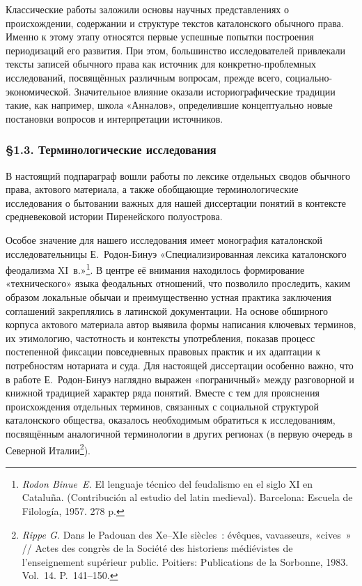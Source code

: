 Классические работы заложили основы научных представлениях о происхождении, содержании и структуре текстов каталонского обычного права. Именно к этому этапу относятся первые успешные попытки построения периодизаций его развития. При этом, большинство исследователей привлекали тексты записей обычного права как источник для конкретно-проблемных исследований, посвящённых различным вопросам, прежде всего, социально-экономической. Значительное влияние оказали историографические традиции такие, как например, школа «Анналов», определившие концептуально новые постановки вопросов и интерпретации источников.

\subsubsection*{§1.3. Терминологические исследования}

В настоящий подпараграф вошли работы по лексике отдельных сводов обычного права, актового материала, а также обобщающие терминологические исследования о бытовании важных для нашей диссертации понятий в контексте средневековой истории Пиренейского полуострова.

Особое значение для нашего исследования имеет монография каталонской исследовательницы Е.~Родон-Бинуэ «Специализированная лексика каталонского феодализма XI~в.»\footnote{\emph{Rodon Binue~E.} El lenguaje técnico del feudalismo en el siglo XI en Cataluña. (Contribución al estudio del latin medieval). Barcelona: Escuela de Filología, 1957. 278 p.}. В центре её внимания находилось формирование «технического» языка феодальных отношений, что позволило проследить, каким образом локальные обычаи и преимущественно устная практика заключения соглашений закреплялись в латинской документации. На основе обширного корпуса актового материала автор выявила формы написания ключевых терминов, их этимологию, частотность и контексты употребления, показав процесс постепенной фиксации повседневных правовых практик и их адаптации к потребностям нотариата и суда. Для настоящей диссертации особенно важно, что в работе Е.~Родон-Бинуэ наглядно выражен «пограничный» между разговорной и книжной традицией характер ряда понятий. Вместе с тем для прояснения происхождения отдельных терминов, связанных с социальной структурой каталонского общества, оказалось необходимым обратиться к исследованиям, посвящённым аналогичной терминологии в других регионах (в первую очередь в Северной Италии\footnote{\emph{Rippe G.} Dans le Padouan des Xe--XIe siècles~: évêques, vavasseurs, «cives~» // Actes des congrès de la Société des historiens médiévistes de l’enseignement supérieur public. Poitiers: Publications de la Sorbonne, 1983. Vol.~14. P.~141--150.}).

